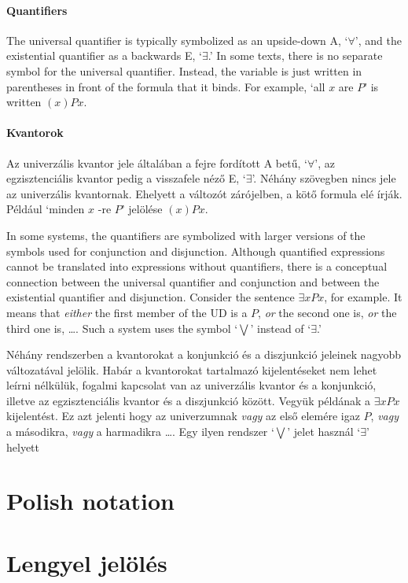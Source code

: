 \paragraph{Quantifiers} The universal quantifier is typically symbolized as an upside-down A, `$\forall$', and the existential quantifier as a backwards E, `$\exists$.' In some texts, there is no separate symbol for the universal quantifier. Instead, the variable is just written in parentheses in front of the formula that it binds. For example, `all $x$ are $P$' is written $(x)Px$.

\paragraph{Kvantorok} Az univerzális kvantor jele általában a fejre fordított A betű, `$\forall$', az egzisztenciális kvantor pedig a visszafele néző E, `$\exists$'. Néhány szövegben nincs jele az univerzális kvantornak. Ehelyett a változót zárójelben, a kötő formula elé írják. Például `minden $x$ -re $P$' jelölése $(x)Px$.


In some systems, the quantifiers are symbolized with larger versions of the symbols used for conjunction and disjunction. Although quantified expressions cannot be translated into expressions without quantifiers, there is a conceptual connection between the universal quantifier and conjunction and between the existential quantifier and disjunction. Consider the sentence $\exists x Px$, for example. It means that \emph{either} the first member of the UD is a $P$, \emph{or} the second one is, \emph{or} the third one is, {\ldots}. Such a system uses the symbol `$\bigvee$' instead of `$\exists$.'

Néhány rendszerben a kvantorokat a konjunkció és a diszjunkció jeleinek nagyobb változatával jelölik. Habár a kvantorokat tartalmazó kijelentéseket nem lehet leírni nélkülük, fogalmi kapcsolat van az univerzális kvantor és a konjunkció, illetve az egzisztenciális kvantor és a diszjunkció között. Vegyük példának a $\exists x Px$ kijelentést. Ez azt jelenti hogy az univerzumnak \emph{vagy} az első elemére igaz $P$, \emph{vagy} a másodikra, \emph{vagy} a harmadikra {\ldots}. Egy ilyen rendszer `$\bigvee$' jelet használ `$\exists$' helyett



\section*{Polish notation}
\section{Lengyel jelölés}

